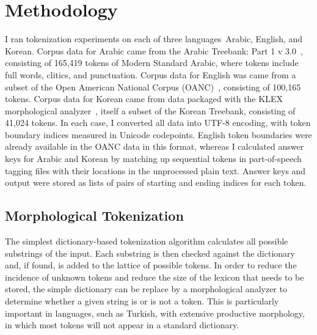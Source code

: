 \chapter{Methodology}

I ran tokenization experiments on each of three languages\textemdash~Arabic, English, and Korean. Corpus data for Arabic came from the Arabic Treebank: Part 1 v 3.0~\cite{maamouri05}, consisting of 165,419 tokens of Modern Standard Arabic, where tokens include full words, clitics, and punctuation. Corpus data for English was came from a subset of the Open American National Corpus (OANC)~\cite{oanc}, consisting of 100,165 tokens. Corpus data for Korean came from data packaged with the KLEX morphological analyzer~\cite{han04}, itself a subset of the Korean Treebank, consisting of 41,024 tokens. In each case, I converted all data into UTF-8 encoding, with token boundary indices measured in Unicode codepoints. English token boundaries were already available in the OANC data in this format, whereas I calculated answer keys for Arabic and Korean by matching up sequential tokens in part-of-speech tagging files with their locations in the unprocessed plain text. Answer keys and output were stored as lists of pairs of starting and ending indices for each token.

\section{Morphological Tokenization}
The simplest dictionary-based tokenization algorithm calculates all possible substrings of the input. Each substring is then checked against the dictionary and, if found, is added to the lattice of possible tokens. In order to reduce the incidence of unknown tokens and reduce the size of the lexicon that needs to be stored, the simple dictionary can be replace by a morphological analyzer to determine whether a given string is or is not a token. This is particularly important in languages, such as Turkish, with extensive productive morphology, in which most tokens will not appear in a standard dictionary.

